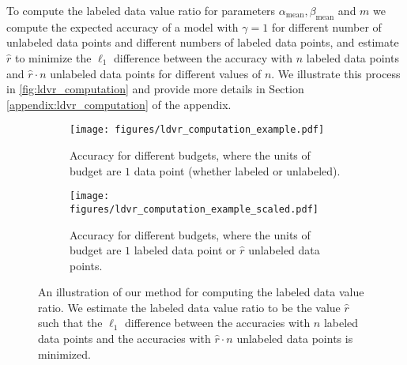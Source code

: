 To compute the labeled data value ratio for parameters $\alpha_\text{mean},\beta_\text{mean}$ and $m$ we compute the expected accuracy of a model with $\gamma=1$ for different number of unlabeled data points and different numbers of labeled data points, and estimate $\hat{r}$ to minimize the $\ell_1$ difference between the accuracy with $n$ labeled data points and $\hat{r}\cdot n$ unlabeled data points for different values of $n$. We illustrate this process in \autoref{fig:ldvr_computation} and provide more details in Section \ref{appendix:ldvr_computation} of the appendix.

\begin{figure}
\centering
\begin{subfigure}{.45\textwidth}
  \centering
  \texttt{[image: figures/ldvr\_computation\_example.pdf]}
  \caption{Accuracy for different budgets, where the units of budget are $1$ data point (whether labeled or unlabeled).}
  \label{fig:ldvr_computation_before}
\end{subfigure}
\hspace{5mm}
\begin{subfigure}{.45\textwidth}
  \centering
  \texttt{[image: figures/ldvr\_computation\_example\_scaled.pdf]}
  \caption{Accuracy for different budgets, where the units of budget are $1$ labeled data point or $\hat{r}$ unlabeled data points.}
  \label{fig:ldvr_computation_after}
\end{subfigure}
\caption{An illustration of our method for computing the labeled data value ratio. We estimate the labeled data value ratio to be the value $\hat{r}$ such that the $\ell_1$ difference between the accuracies with $n$ labeled data points and the accuracies with $\hat{r}\cdot n$ unlabeled data points is minimized.}
\label{fig:ldvr_computation}
\end{figure}

